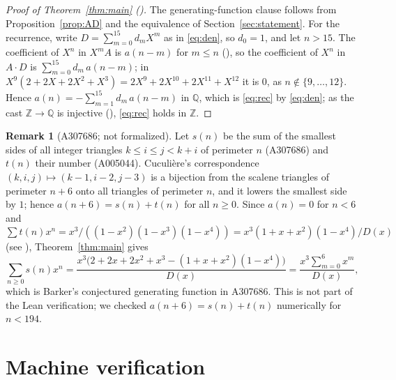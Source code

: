 \documentclass[11pt]{amsart}
\theoremstyle{plain}
\theoremstyle{definition}
\newtheorem{remark}[theorem]{Remark}
\newcommand{\Q}{\mathbb{Q}}
\newcommand{\Z}{\mathbb{Z}}
\begin{document}
\begin{proof}[Proof of Theorem~\ref{thm:main} ()]
The generating-function clause follows from Proposition~\ref{prop:AD} and the equivalence  of Section~\ref{sec:statement}.
For the recurrence, write $D=\sum_{m=0}^{15}d_mX^m$ as in \eqref{eq:den}, so $d_0=1$, and let $n>15$.
The coefficient of $X^n$ in $X^mA$ is $a(n-m)$ for $m\le n$ (), so the coefficient of $X^n$ in $A\cdot D$ is $\sum_{m=0}^{15}d_m\,a(n-m)$; in $X^9(2+2X+2X^2+X^3)=2X^9+2X^{10}+2X^{11}+X^{12}$ it is $0$, as $n\notin\{9,\dots,12\}$.
Hence $a(n)=-\sum_{m=1}^{15}d_m\,a(n-m)$ in $\Q$, which is \eqref{eq:rec} by \eqref{eq:den}; as the cast $\Z\to\Q$ is injective (), \eqref{eq:rec} holds in $\Z$.
\end{proof}

\begin{remark}[A307686; not formalized]\label{rem:A307686}
Let $s(n)$ be the sum of the smallest sides of all integer triangles $k\le i\le j<k+i$ of perimeter $n$ (A307686) and $t(n)$ their number (A005044).
Cuculière's correspondence $(k,i,j)\mapsto(k-1,i-2,j-3)$ is a bijection from the scalene triangles of perimeter $n+6$ onto all triangles of perimeter $n$, and it lowers the smallest side by $1$; hence $a(n+6)=s(n)+t(n)$ for all $n\ge0$.
Since $a(n)=0$ for $n<6$ and $\sum t(n)x^n=x^3/((1-x^2)(1-x^3)(1-x^4))=x^3(1+x+x^2)(1-x^4)/D(x)$ (see \cite{APR01,Hir02}), Theorem~\ref{thm:main} gives
\[
  \sum_{n\ge0}s(n)x^n=\frac{x^3\bigl(2+2x+2x^2+x^3-(1+x+x^2)(1-x^4)\bigr)}{D(x)}=\frac{x^3\sum_{m=0}^{6}x^m}{D(x)},
\]
which is Barker's conjectured generating function in A307686. This is not part of the Lean verification; we checked $a(n+6)=s(n)+t(n)$ numerically for $n<194$.
\end{remark}

\section{Machine verification}\label{sec:lean}
\end{document}
